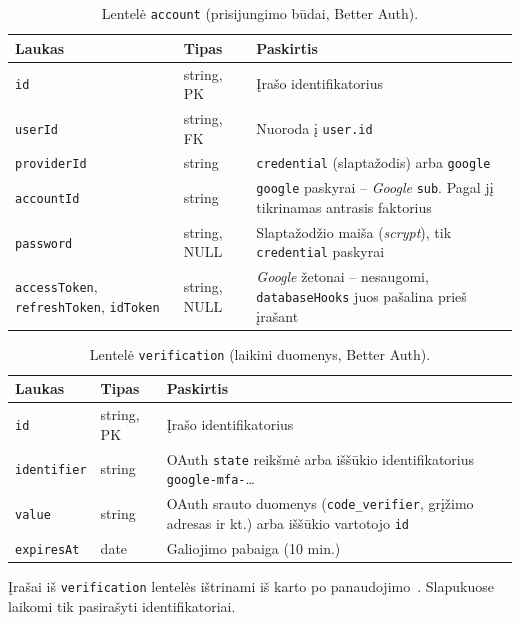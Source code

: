 \begin{table}[H]
    \centering
    \caption{Lentelė \texttt{account} (prisijungimo būdai, Better Auth).}
    \label{tab:db_account}
    \begin{tabularx}{\textwidth}{l l L}
        \toprule
        \textbf{Laukas} & \textbf{Tipas} & \textbf{Paskirtis} \\
        \midrule
        \texttt{id} & string, PK & Įrašo identifikatorius \\
        \texttt{userId} & string, FK & Nuoroda į \texttt{user.id} \\
        \texttt{providerId} & string & \texttt{credential} (slaptažodis) arba \texttt{google} \\
        \texttt{accountId} & string & \texttt{google} paskyrai -- \textit{Google} \texttt{sub}. Pagal jį tikrinamas antrasis faktorius \\
        \texttt{password} & string, NULL & Slaptažodžio maiša (\textit{scrypt}), tik \texttt{credential} paskyrai \\
        \texttt{accessToken}, \texttt{refreshToken}, \texttt{idToken} & string, NULL & \textit{Google} žetonai -- nesaugomi, \texttt{databaseHooks} juos pašalina prieš įrašant \\
        \bottomrule
    \end{tabularx}
\end{table}

\begin{table}[H]
    \centering
    \caption{Lentelė \texttt{verification} (laikini duomenys, Better Auth).}
    \label{tab:db_verification}
    \begin{tabularx}{\textwidth}{l l L}
        \toprule
        \textbf{Laukas} & \textbf{Tipas} & \textbf{Paskirtis} \\
        \midrule
        \texttt{id} & string, PK & Įrašo identifikatorius \\
        \texttt{identifier} & string & OAuth \texttt{state} reikšmė arba iššūkio identifikatorius \texttt{google-mfa-}\ldots \\
        \texttt{value} & string & OAuth srauto duomenys (\texttt{code\_verifier}, grįžimo adresas ir kt.) arba iššūkio vartotojo \texttt{id} \\
        \texttt{expiresAt} & date & Galiojimo pabaiga (10 min.) \\
        \bottomrule
    \end{tabularx}
\end{table}

Įrašai iš \texttt{verification} lentelės ištrinami iš karto po panaudojimo~\cite{better_auth_security}. Slapukuose laikomi tik pasirašyti identifikatoriai.
